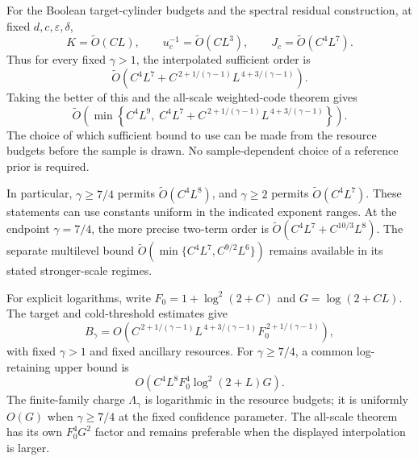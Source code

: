 For the Boolean target-cylinder budgets and the spectral residual
construction, at fixed $d,c,\varepsilon,\delta$,
\[
 K=\widetilde O(CL),\qquad
 u_c^{-1}=\widetilde O(CL^3),\qquad
 J_c=\widetilde O(C^4L^7).
\]
Thus for every fixed $\gamma>1$, the interpolated sufficient order is
\begin{equation}\label{eq:spectral-interpolation-powers}
 \widetilde O\left(
 C^4L^7+
 C^{\,2+1/(\gamma-1)}L^{\,4+3/(\gamma-1)}\right).
\end{equation}
Taking the better of this and the all-scale weighted-code theorem gives
\[
 \widetilde O\!\left(\min\left\{
 C^4L^9,\;
 C^4L^7+C^{\,2+1/(\gamma-1)}L^{\,4+3/(\gamma-1)}
 \right\}\right).
\]
The choice of which sufficient bound to use can be made from the resource
budgets before the sample is drawn. No sample-dependent choice of a
reference prior is required.

In particular, $\gamma\ge7/4$ permits
$\widetilde O(C^4L^8)$, and $\gamma\ge2$ permits
$\widetilde O(C^4L^7)$. These statements can use constants uniform in
the indicated exponent ranges. At the endpoint $\gamma=7/4$, the
more precise two-term order is
$\widetilde O(C^4L^7+C^{10/3}L^8)$.
The separate multilevel bound
$\widetilde O(\min\{C^4L^7,C^{9/2}L^6\})$ remains available in its
stated stronger-scale regimes.

For explicit logarithms, write $F_0=1+\log^2(2+C)$ and
$G=\log(2+CL)$. The target and cold-threshold estimates give
\[
 B_\gamma=
 O\!\left(C^{\,2+1/(\gamma-1)}
          L^{\,4+3/(\gamma-1)}F_0^{\,2+1/(\gamma-1)}\right),
\]
with fixed $\gamma>1$ and fixed ancillary resources.
For $\gamma\ge7/4$, a common log-retaining upper bound is
\[
 O\!\left(C^4L^8F_0^4\log^2(2+L)G\right).
\]
The finite-family charge $\Lambda_\gamma$ is logarithmic in the
resource budgets; it is uniformly $O(G)$ when $\gamma\ge7/4$ at the
fixed confidence parameter. The all-scale theorem has its own
$F_0^4G^2$ factor and remains preferable when the displayed interpolation
is larger.
